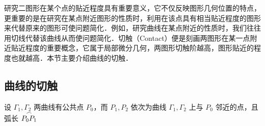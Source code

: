 
研究二图形在某个点的贴近程度具有重要意义，它不仅反映图形几何位置的特点，更重要的是在研究在某点附近图形的性质时，利用在该点具有相当贴近程度的图形来代替原来的图形可使问题简化．例如，研究曲线在某点附近的性质时，我们往往用切线代替该曲线从而使问题简化．切触（Contact）便是刻画两图形在某一点附近贴近程度的重要概念，它属于局部微分几何，两图形切触阶越高，图形贴近的程度也就越高．本节主要介绍曲线的切触．
\subsection{曲线的切触}
设 $\Gamma_1,\Gamma_2$ 两曲线有公共点 $P_0$，而 $P_1,P_2$ 依次为曲线 $\Gamma_1,\Gamma_2$ 上与 $P_0$ 邻近的点，且弧长 $\overset{\Large\frown}{P_0P_1}$